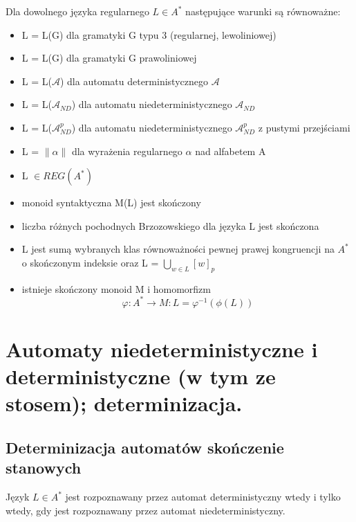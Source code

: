 \documentclass[main.tex]{subfiles}
\begin{document}
    \begin{theorem}
        Dla dowolnego języka regularnego $L \in A^*$ następujące warunki są równoważne:
        \begin{itemize}[noitemsep]
            \item L = L(G) dla gramatyki G typu 3 (regularnej, lewoliniowej)
            \item L = L(G) dla gramatyki G prawoliniowej
            \item L = L($\mathcal{A}$) dla automatu deterministycznego $\mathcal{A}$
            \item L = L($\mathcal{A}_{ND}$) dla automatu niedeterministycznego $\mathcal{A}_{ND}$
            \item L = L($\mathcal{A}_{ND}^p$) dla automatu niedeterministycznego $\mathcal{A}_{ND}^p$ z pustymi przejściami

            \item L = $\|\alpha\|$ dla wyrażenia regularnego $\alpha$ nad alfabetem A
            \item L $\in REG(A^*)$
            \item monoid syntaktyczna M(L) jest skończony
            \item liczba różnych pochodnych Brzozowskiego dla języka
            L jest skończona
            \item L jest sumą wybranych klas równoważności pewnej prawej kongruencji na $A^*$
            o skończonym indeksie oraz L = $\bigcup\limits_{w \in L}[w]_p$
            \item istnieje skończony monoid M i homomorfizm
            \[\varphi : A^* \rightarrow M : L = \varphi^{-1}(\phi(L))\]
        \end{itemize}
    \end{theorem}


    \section{Automaty niedeterministyczne i deterministyczne (w tym ze stosem); determinizacja.}

    \subsection{Determinizacja automatów skończenie stanowych}

    \begin{theorem}
        Język $L \in A^*$ jest rozpoznawany przez automat deterministyczny wtedy
        i tylko wtedy, gdy jest rozpoznawany przez automat niedeterministyczny.
    \end{theorem}
\end{document}
